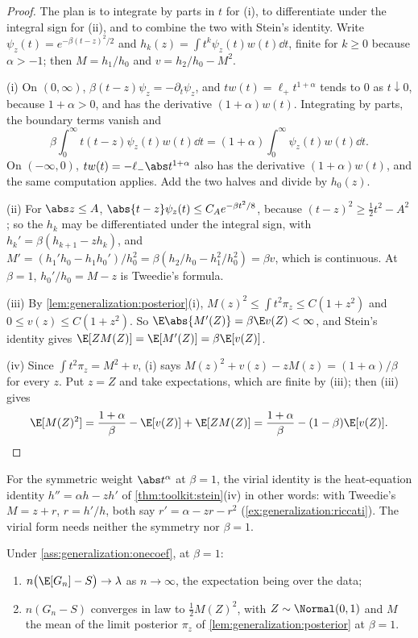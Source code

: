 \begin{refsection}
\begin{proof}
The plan is to integrate by parts in $t$ for (i), to differentiate under the integral sign for (ii), and to combine the two with Stein's identity. Write $\psi_z(t)=e^{-\beta(t-z)^2/2}$ and $h_k(z)=\int t^k\psi_z(t)w(t)\dd t$, finite for $k\ge0$ because $\alpha>-1$; then $M=h_1/h_0$ and $v=h_2/h_0-M^2$.

(i) On $(0,\infty)$, $\beta(t-z)\psi_z=-\partial_t\psi_z$, and $tw(t)=\ell_+t^{1+\alpha}$ tends to $0$ as $t\downarrow0$, because $1+\alpha>0$, and has the derivative $(1+\alpha)w(t)$. Integrating by parts, the boundary terms vanish and
\[
\beta\int_0^\infty t(t-z)\psi_z(t)w(t)\dd t=(1+\alpha)\int_0^\infty\psi_z(t)w(t)\dd t .
\]
On $(-\infty,0)$, $tw(t)=-\ell_-\abs t^{1+\alpha}$ also has the derivative $(1+\alpha)w(t)$, and the same computation applies. Add the two halves and divide by $h_0(z)$.

(ii) For $\abs z\le A$, $\abs{t-z}\psi_z(t)\le C_Ae^{-\beta t^2/8}$, because $(t-z)^2\ge\frac12t^2-A^2$; so the $h_k$ may be differentiated under the integral sign, with $h_k'=\beta(h_{k+1}-zh_k)$, and $M'=(h_1'h_0-h_1h_0')/h_0^2=\beta(h_2/h_0-h_1^2/h_0^2)=\beta v$, which is continuous. At $\beta=1$, $h_0'/h_0=M-z$ is Tweedie's formula.

(iii) By \cref{lem:generalization:posterior}(i), $M(z)^2\le\int t^2\pi_z\le C(1+z^2)$ and $0\le v(z)\le C(1+z^2)$. So $\E\abs{M'(Z)}=\beta\E v(Z)<\infty$, and Stein's identity gives $\E[ZM(Z)]=\E[M'(Z)]=\beta\E[v(Z)]$.

(iv) Since $\int t^2\pi_z=M^2+v$, (i) says $M(z)^2+v(z)-zM(z)=(1+\alpha)/\beta$ for every $z$. Put $z=Z$ and take expectations, which are finite by (iii); then (iii) gives
\[
\E[M(Z)^2]=\frac{1+\alpha}\beta-\E[v(Z)]+\E[ZM(Z)]=\frac{1+\alpha}\beta-(1-\beta)\E[v(Z)] .\qedhere
\]
\end{proof}

For the symmetric weight $\abs t^\alpha$ at $\beta=1$, the virial identity is the heat-equation identity $h''=\alpha h-zh'$ of \cref{thm:toolkit:stein}(iv) in other words: with Tweedie's $M=z+r$, $r=h'/h$, both say $r'=\alpha-zr-r^2$ (\cref{ex:generalization:riccati}). The virial form needs neither the symmetry nor $\beta=1$.

\begin{theorem}\label{thm:generalization:onecoef}
Under \cref{ass:generalization:onecoef}, at $\beta=1$:
\begin{enumerate}[label=(\roman*),nosep]
\item $n\bigl(\E[G_n]-S\bigr)\to\lambda$ as $n\to\infty$, the expectation being over the data;
\item $n(G_n-S)$ converges in law to $\frac12M(Z)^2$, with $Z\sim\Normal(0,1)$ and $M$ the mean of the limit posterior $\pi_z$ of \cref{lem:generalization:posterior} at $\beta=1$.
\end{enumerate}
\end{theorem}


\end{refsection}
